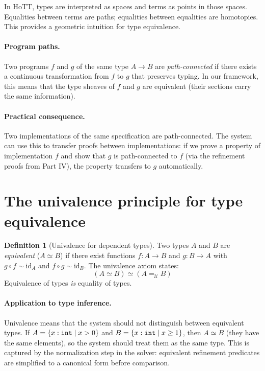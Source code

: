 \documentclass[11pt]{report}
\DeclareRobustCommand{\py}[1]{\texttt{\detokenize{#1}}}
\theoremstyle{definition}
\newtheorem{definition}{Definition}[section]
\theoremstyle{plain}
\begin{document}
In HoTT, types are interpreted as spaces and terms as points in those spaces.
Equalities between terms are paths; equalities between equalities are
homotopies. This provides a geometric intuition for type equivalence.

\paragraph{Program paths.}
Two programs $f$ and $g$ of the same type $A \to B$ are \emph{path-connected}
if there exists a continuous transformation from $f$ to $g$ that preserves
typing. In our framework, this means that the type sheaves of $f$ and $g$ are
equivalent (their sections carry the same information).

\paragraph{Practical consequence.}
Two implementations of the same specification are path-connected. The system
can use this to transfer proofs between implementations: if we prove a
property of implementation $f$ and show that $g$ is path-connected to $f$
(via the refinement proofs from Part IV), the property transfers to $g$
automatically.

\section{The univalence principle for type equivalence}

\begin{definition}[Univalence for dependent types]
Two types $A$ and $B$ are \emph{equivalent} ($A \simeq B$) if there exist
functions $f : A \to B$ and $g : B \to A$ with $g \circ f \sim \mathrm{id}_A$
and $f \circ g \sim \mathrm{id}_B$. The univalence axiom states:
\[
  (A \simeq B) \simeq (A =_{\mathcal{U}} B)
\]
Equivalence of types \emph{is} equality of types.
\end{definition}

\paragraph{Application to type inference.}
Univalence means that the system should not distinguish between equivalent
types. If $A = \{x : \py{int} \mid x > 0\}$ and $B = \{x : \py{int} \mid
x \geq 1\}$, then $A \simeq B$ (they have the same elements), so the
system should treat them as the same type. This is captured by the
normalization step in the solver: equivalent refinement predicates are
simplified to a canonical form before comparison.
\end{document}
